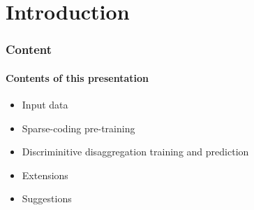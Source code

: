 \documentclass[gray]{beamer}
\begin{document}




\frame{\titlepage}
\section{Introduction}
\begin{frame}
\frametitle{Content}
\framesubtitle{Contents of this presentation}
\begin{itemize}
\item{Input data}
\item{Sparse-coding pre-training}
\item{Discriminitive disaggregation training and prediction}
\item{Extensions}
\item{Suggestions}
\end{itemize}
\end{frame}
\end{document}
